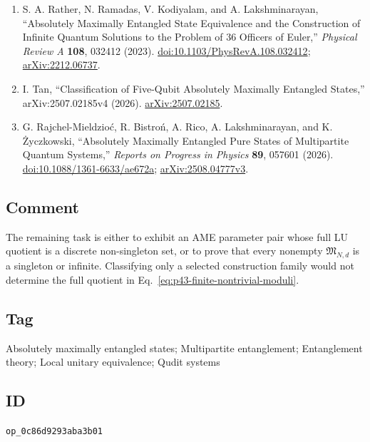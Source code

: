 \begin{enumerate}[label={},leftmargin=4.8em,labelsep=0.5em]
  \footnotesize
  \item[\textup{[RRKL23]}]\label{ref:p43-rather}
  S. A. Rather, N. Ramadas, V. Kodiyalam, and A. Lakshminarayan,
  ``Absolutely Maximally Entangled State Equivalence and the Construction of
  Infinite Quantum Solutions to the Problem of 36 Officers of Euler,''
  \emph{Physical Review A} \textbf{108}, 032412 (2023).
  \href{https://doi.org/10.1103/PhysRevA.108.032412}%
       {doi:10.1103/PhysRevA.108.032412};
  \href{https://arxiv.org/abs/2212.06737}{arXiv:2212.06737}.

  \item[\textup{[Tan26]}]\label{ref:p43-tan}
  I. Tan, ``Classification of Five-Qubit Absolutely Maximally Entangled
  States,'' arXiv:2507.02185v4 (2026).
  \href{https://arxiv.org/abs/2507.02185}{arXiv:2507.02185}.

  \item[\textup{[RBR+26]}]\label{ref:p43-review}
  G. Rajchel-Mieldzio{\'c}, R. Bistro{\'n}, A. Rico, A. Lakshminarayan, and
  K. {\.{Z}}yczkowski, ``Absolutely Maximally Entangled Pure States of
  Multipartite Quantum Systems,'' \emph{Reports on Progress in Physics}
  \textbf{89}, 057601 (2026).
  \href{https://doi.org/10.1088/1361-6633/ae672a}%
       {doi:10.1088/1361-6633/ae672a};
  \href{https://arxiv.org/abs/2508.04777}{arXiv:2508.04777v3}.
\end{enumerate}

\subsection*{Comment}

The remaining task is either to exhibit an AME parameter pair whose full LU
quotient is a discrete non-singleton set, or to prove that every nonempty
$\mathfrak{M}_{N,d}$ is a singleton or infinite.  Classifying only a selected
construction family would not determine the full quotient in
Eq.~\eqref{eq:p43-finite-nontrivial-moduli}.

\subsection*{Tag}

Absolutely maximally entangled states; Multipartite entanglement;
Entanglement theory; Local unitary equivalence; Qudit systems

\subsection*{ID}

\texttt{op\_0c86d9293aba3b01}
